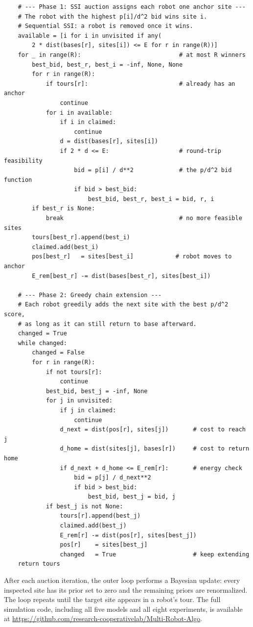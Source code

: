 \begin{doublespacing}
{\begin{verbatim}
    # --- Phase 1: SSI auction assigns each robot one anchor site ---
    # The robot with the highest p[i]/d^2 bid wins site i.
    # Sequential SSI: a robot is removed once it wins.
    available = [i for i in unvisited if any(
        2 * dist(bases[r], sites[i]) <= E for r in range(R))]
    for _ in range(R):                            # at most R winners
        best_bid, best_r, best_i = -inf, None, None
        for r in range(R):
            if tours[r]:                          # already has an anchor
                continue
            for i in available:
                if i in claimed:
                    continue
                d = dist(bases[r], sites[i])
                if 2 * d <= E:                    # round-trip feasibility
                    bid = p[i] / d**2             # the p/d^2 bid function
                    if bid > best_bid:
                        best_bid, best_r, best_i = bid, r, i
        if best_r is None:
            break                                 # no more feasible sites
        tours[best_r].append(best_i)
        claimed.add(best_i)
        pos[best_r]   = sites[best_i]            # robot moves to anchor
        E_rem[best_r] -= dist(bases[best_r], sites[best_i])

    # --- Phase 2: Greedy chain extension ---
    # Each robot greedily adds the next site with the best p/d^2 score,
    # as long as it can still return to base afterward.
    changed = True
    while changed:
        changed = False
        for r in range(R):
            if not tours[r]:
                continue
            best_bid, best_j = -inf, None
            for j in unvisited:
                if j in claimed:
                    continue
                d_next = dist(pos[r], sites[j])       # cost to reach j
                d_home = dist(sites[j], bases[r])     # cost to return home
                if d_next + d_home <= E_rem[r]:       # energy check
                    bid = p[j] / d_next**2
                    if bid > best_bid:
                        best_bid, best_j = bid, j
            if best_j is not None:
                tours[r].append(best_j)
                claimed.add(best_j)
                E_rem[r] -= dist(pos[r], sites[best_j])
                pos[r]    = sites[best_j]
                changed   = True                      # keep extending
    return tours
\end{verbatim}}

After each auction iteration, the outer loop performs a Bayesian update:
every inspected site has its prior set to zero and the remaining priors
are renormalized. The loop repeats until the target site appears in a
robot's tour. The full simulation code, including all five models and
all eight experiments, is available at
\url{https://github.com/research-cooperativelab/Multi-Robot-Algo}.


\end{doublespacing}
